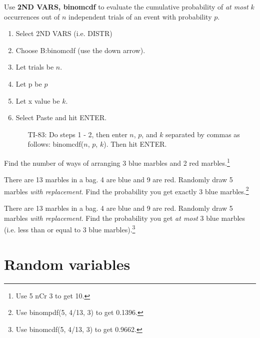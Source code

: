 \begin{termBox}{ 
Use \textbf{2ND VARS, binomcdf} to evaluate the cumulative probability of \emph{at most} $k$ occurrences out of $n$ independent trials of an event with probability $p$. 
\begin{enumerate}
\setlength{\itemsep}{0mm}
\item Select 2ND VARS (i.e. DISTR)
\item Choose B:binomcdf  (use the down arrow).
\item Let trials be $n$.
\item Let p be $p$
\item Let x value be $k$.
\item Select Paste and hit ENTER.\vspace{-1.5mm}
\begin{itemize}
\item[TI-83: ] Do steps 1 - 2, then enter $n$, $p$, and $k$ separated by commas as follows: binomcdf($n$, $p$, $k$). Then hit ENTER.
\end{itemize}
\end{enumerate}
}
\end{termBox}

\textPE{\pagebreak}

\begin{exercise}Find the number of ways of arranging 3 blue marbles and 2 red marbles.\footnote{Use 5 nCr 3 to get 10. }
\end{exercise}

\begin{exercise}There are 13 marbles in a bag.  4 are blue and 9 are red.  Randomly draw 5 marbles \emph{with replacement}.  Find the probability you get exactly 3 blue marbles.\footnote{Use binompdf(5, 4/13, 3) to get 0.1396.}
\end{exercise}

\begin{exercise}There are 13 marbles in a bag.  4 are blue and 9 are red.  Randomly draw 5 marbles \emph{with replacement}.  Find the probability you get \emph{at most} 3 blue marbles (i.e. less than or equal to 3 blue marbles).\footnote{Use binomcdf(5, 4/13, 3) to get 0.9662.}
\end{exercise}




\section{Random variables}
\label{randomVariablesSection}

